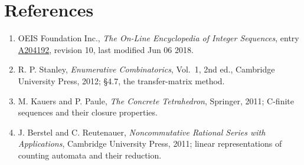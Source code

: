 \documentclass[11pt]{article}
\theoremstyle{definition}
\begin{document}
\section{References}

\begin{enumerate}

\item OEIS Foundation Inc., \emph{The On-Line Encyclopedia of Integer Sequences}, entry \href{https://oeis.org/A204192}{A204192}, revision 10, last modified Jun 06 2018.

\item R. P. Stanley, \emph{Enumerative Combinatorics}, Vol.~1, 2nd ed., Cambridge University Press, 2012; \S4.7, the transfer-matrix method.

\item M. Kauers and P. Paule, \emph{The Concrete Tetrahedron}, Springer, 2011; C-finite sequences and their closure properties.

\item J. Berstel and C. Reutenauer, \emph{Noncommutative Rational Series with Applications}, Cambridge University Press, 2011; linear representations of counting automata and their reduction.

\end{enumerate}
\end{document}
